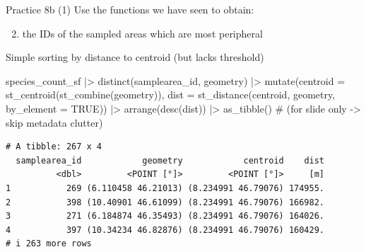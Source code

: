 \documentclass[
  ignorenonframetext,
  aspectratio=169,
  t]{beamer}
\newenvironment{Shaded}{\begin{snugshade}}{\end{snugshade}}
\newcommand{\AttributeTok}[1]{\textcolor[rgb]{0.40,0.45,0.13}{#1}}
\newcommand{\CommentTok}[1]{\textcolor[rgb]{0.37,0.37,0.37}{#1}}
\newcommand{\ConstantTok}[1]{\textcolor[rgb]{0.56,0.35,0.01}{#1}}
\newcommand{\FunctionTok}[1]{\textcolor[rgb]{0.28,0.35,0.67}{#1}}
\newcommand{\NormalTok}[1]{\textcolor[rgb]{0.00,0.23,0.31}{#1}}
\newcommand{\SpecialCharTok}[1]{\textcolor[rgb]{0.37,0.37,0.37}{#1}}
\providecommand{\tightlist}{%
  \setlength{\itemsep}{0pt}\setlength{\parskip}{0pt}}
\begin{document}
\begin{frame}[fragile]{Practice 8b (1)}
\protect{}\label{practice-8b-1}
Use the functions we have seen to obtain:

\begin{enumerate}
\setcounter{enumi}{1}
\tightlist
\item
  the IDs of the sampled areas which are most peripheral
\end{enumerate}

Simple sorting by distance to centroid (but lacks threshold)

\footnotesize

\begin{Shaded}
\begin{Highlighting}[]
\NormalTok{species\_count\_sf }\SpecialCharTok{|\textgreater{}} 
  \FunctionTok{distinct}\NormalTok{(samplearea\_id, geometry) }\SpecialCharTok{|\textgreater{}} 
  \FunctionTok{mutate}\NormalTok{(}\AttributeTok{centroid =} \FunctionTok{st\_centroid}\NormalTok{(}\FunctionTok{st\_combine}\NormalTok{(geometry)),}
         \AttributeTok{dist =} \FunctionTok{st\_distance}\NormalTok{(centroid, geometry, }\AttributeTok{by\_element =} \ConstantTok{TRUE}\NormalTok{)) }\SpecialCharTok{|\textgreater{}} 
  \FunctionTok{arrange}\NormalTok{(}\FunctionTok{desc}\NormalTok{(dist)) }\SpecialCharTok{|\textgreater{}} 
  \FunctionTok{as\_tibble}\NormalTok{() }\CommentTok{\# (for slide only {-}\textgreater{} skip metadata clutter)}
\end{Highlighting}
\end{Shaded}

\begin{verbatim}
# A tibble: 267 x 4
  samplearea_id            geometry            centroid    dist
          <dbl>         <POINT [°]>         <POINT [°]>     [m]
1           269 (6.110458 46.21013) (8.234991 46.79076) 174955.
2           398 (10.40901 46.61099) (8.234991 46.79076) 166982.
3           271 (6.184874 46.35493) (8.234991 46.79076) 164026.
4           397 (10.34234 46.82876) (8.234991 46.79076) 160429.
# i 263 more rows
\end{verbatim}

\normalsize
\end{frame}
\end{document}
